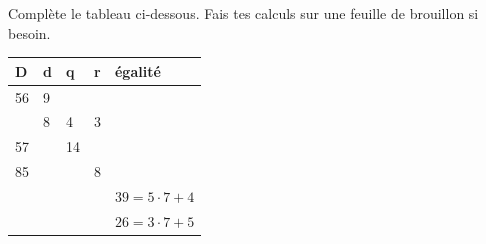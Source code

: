 %
%
Complète le tableau ci-dessous. Fais tes calculs sur une feuille de brouillon si besoin.

    \begin{tabular}{|l|l|l|l|l|}
        \hline
        D  & d & q  & r & égalité         \\
        \hline
        56 & 9 &    &   &                 \\
        \hline
           & 8 & 4  & 3 &                 \\
           \hline
        57 &   & 14 &   &                 \\
        \hline
        85 &   &    & 8 &                 \\
        \hline
           &   &    &   & $39=5\cdot 7+4$ \\
        \hline
           &   &    &   & $26=3\cdot 7+5$ \\
        \hline
    \end{tabular}
